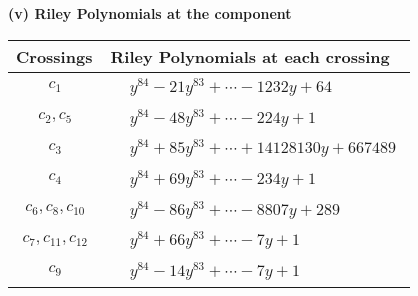 \documentclass[1p]{elsarticle_modified}
\theoremstyle{definition}
\begin{document}
\newpage\renewcommand{\arraystretch}{1}
\flushleft \textbf{(v) Riley Polynomials at the component}\newline \\
\begin{tabular}{m{50pt}|m{274pt}}
Crossings & \hspace{64pt}Riley Polynomials at each crossing \\
\hline $$\begin{aligned}c_{1}\end{aligned}$$&$\begin{aligned}
&y^{84}-21 y^{83}+\cdots-1232 y+64
\end{aligned}$\\
\hline $$\begin{aligned}c_{2},c_{5}\end{aligned}$$&$\begin{aligned}
&y^{84}-48 y^{83}+\cdots-224 y+1
\end{aligned}$\\
\hline $$\begin{aligned}c_{3}\end{aligned}$$&$\begin{aligned}
&y^{84}+85 y^{83}+\cdots+14128130 y+667489
\end{aligned}$\\
\hline $$\begin{aligned}c_{4}\end{aligned}$$&$\begin{aligned}
&y^{84}+69 y^{83}+\cdots-234 y+1
\end{aligned}$\\
\hline $$\begin{aligned}c_{6},c_{8},c_{10}\end{aligned}$$&$\begin{aligned}
&y^{84}-86 y^{83}+\cdots-8807 y+289
\end{aligned}$\\
\hline $$\begin{aligned}c_{7},c_{11},c_{12}\end{aligned}$$&$\begin{aligned}
&y^{84}+66 y^{83}+\cdots-7 y+1
\end{aligned}$\\
\hline $$\begin{aligned}c_{9}\end{aligned}$$&$\begin{aligned}
&y^{84}-14 y^{83}+\cdots-7 y+1
\end{aligned}$\\
\hline
\end{tabular}\\~\\
\end{document}
